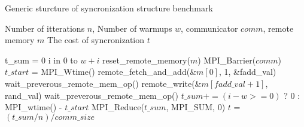 \begin{algorithm}
  \caption{Generic sturcture of syncronization structure benchmark}
  \label{alg:sync_struct_bmark}
  \begin{algorithmic}[1]
    \Require Number of itterations $n$, Number of warmups $w$, communicator $comm$, remote memory $m$
    \Ensure The cost of syncronization $t$
    
    \State t\_sum = 0
    \For i in 0 to $w + i$
            \State reset\_remote\_memory($m$)
        \EndIf
        \State MPI\_Barrier($comm$)
        \State $t\_start$ = MPI\_Wtime()
        \State remote\_fetch\_and\_add(\&$m[0]$, 1, \&fadd\_val)
        \State wait\_preverous\_remote\_mem\_op()
        \State remote\_write(\&$m[fadd\_val+1]$, rand\_val)
        \State wait\_preverous\_remote\_mem\_op()
        \State $t\_sum += (i-w >= 0)$ ? 0 : MPI\_wtime() - $t\_start$
    \EndFor
    \State MPI\_Reduce($t\_sum$, MPI\_SUM, 0) 
    \State $t$ = $(t\_sum/n)/comm\_size$ 
  \end{algorithmic}
\end{algorithm}